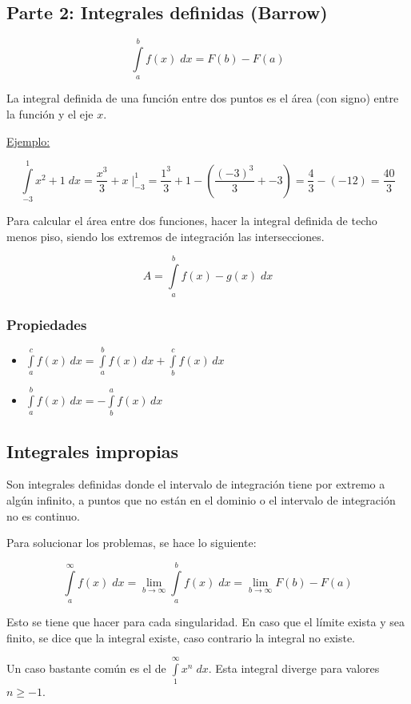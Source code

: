 \subsection*{Parte 2: Integrales definidas (Barrow)}

$$\int\limits^{b}_a f(x)\;dx = 
F(b)-F(a)$$

La integral definida de una función entre dos puntos es el área (con signo) entre la función y el eje $x$.

\vspace{\baselineskip}
\noindent
\underline{Ejemplo:}

$$\int\limits^{1}_{-3} x^2 + 1\;dx =
\dfrac{x^3}{3} + x\;\Bigg |^{1}_{-3} =
\dfrac{1^3}{3} + 1 - \left( \dfrac{(-3)^{3}}{3} + -3\right) =
\dfrac{4}{3} - (-12) = \dfrac{40}{3}
$$

Para calcular el área entre dos funciones, hacer la integral definida de techo menos piso, siendo los extremos de integración las intersecciones.

$$A = \int\limits_{a}^b f(x) - g(x) \;dx$$


\subsubsection*{Propiedades}

\begin{itemize}
    \item $\int\limits_a^c f(x)\,dx = \int\limits_a^b f(x)\,dx + \int\limits_b^c f(x) \,dx$
    
    \item $\int\limits^b_a f(x) \,dx=- \int\limits_b^a f(x)\,dx$
\end{itemize}


\subsection*{Integrales impropias}

Son integrales definidas donde el intervalo de integración tiene por extremo a algún infinito, a puntos que no están en el dominio o el intervalo de integración no es continuo.

Para solucionar los problemas, se hace lo siguiente:

$$\int\limits^\infty_a f(x)\;dx = \lim\limits_{b\rightarrow \infty} \int\limits^b_a f(x) \;dx = \lim\limits_{b\rightarrow \infty} F(b) - F(a)$$

Esto se tiene que hacer para cada singularidad. En caso que el límite exista y sea finito, se dice que la integral existe, caso contrario la integral no existe.

Un caso bastante común es el de $\int\limits_1^\infty x^n\;dx$. Esta integral diverge para valores $n\geq-1$.